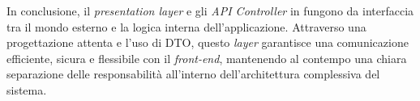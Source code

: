 In conclusione, il \textit{presentation layer} e gli \textit{API Controller} in {\movi} fungono da interfaccia 
tra il mondo esterno e la logica interna dell'applicazione. Attraverso una progettazione attenta e l'uso di DTO, questo 
\textit{layer} garantisce una comunicazione efficiente, sicura e flessibile con il \textit{front-end}, mantenendo al 
contempo una chiara separazione delle responsabilità all'interno dell'architettura complessiva del sistema.